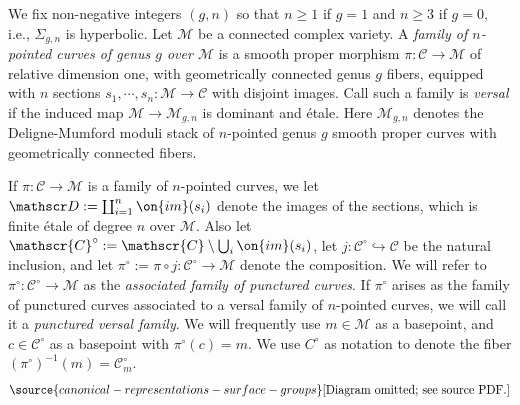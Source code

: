 \begin{notation}
\notready
	\label{notation:versal-family}
	We fix non-negative integers $(g,n)$ so that $n \geq 1$ if $g = 1$ and
	$n \geq 3$ if $g = 0$, i.e., $\Sigma_{g,n}$ is hyperbolic.
	Let $\mathscr{M}$ be a connected complex variety. A \emph{family
	of $n$-pointed curves of genus $g$ over $\mathscr{M}$} is a smooth
	proper morphism $\pi: \mathscr{C}\to \mathscr{M}$ of relative dimension one, with geometrically
	connected genus $g$ fibers, equipped with $n$ sections $s_1,\cdots,
	s_n: \mathscr{M}\to \mathscr{C}$ with disjoint images. Call such a family is \emph{versal} if the
	induced map $\mathscr{M}\to \mathscr{M}_{g,n}$ is dominant and \'etale.
	Here $\mathscr M_{g,n}$ denotes the Deligne-Mumford moduli stack of $n$-pointed genus
	$g$ smooth proper curves with geometrically connected fibers.

	If $\pi: \mathscr{C}\to \mathscr{M}$ is a family of $n$-pointed curves, we let
	$\mathscr D := \coprod_{i=1}^n \on{im}(s_i)$ denote the images of
	the sections, which is finite \'etale of degree $n$ over $\mathscr M$.
	Also let
	$\mathscr{C}^\circ:=\mathscr{C}\setminus \bigcup_i \on{im}(s_i)$,
	let $j: \mathscr C^\circ \hookrightarrow \mathscr{C}$ be the natural
	inclusion, and let $\pi^\circ := \pi \circ j : \mathscr C^\circ \to \mathscr	M$ denote the composition. We will refer to $\pi^\circ: \mathscr{C}^\circ\to \mathscr{M}$ as the \emph{associated family of punctured curves}. If $\pi^\circ$ arises as the family of punctured curves associated to a versal family of $n$-pointed curves, we will call it a \emph{punctured versal family}.
	We will frequently use $m \in \mathscr M$ as a basepoint, and $c \in
	\mathscr C^\circ$ as a basepoint with $\pi^\circ(c) = m$.
	We use $C^\circ$ as notation to denote the fiber $(\pi^\circ)^{-1}(m) = \mathscr
	C^\circ_m$.
	\begin{equation}
		\label{equation:}
\source{canonical-representations-surface-groups}
		\text{[Diagram omitted; see source PDF.]}
	\end{equation}
\end{notation}


